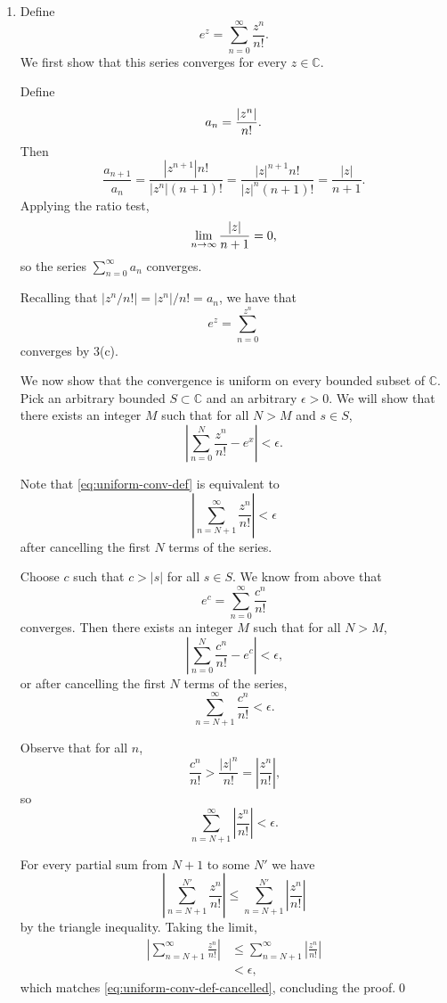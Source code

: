 \documentclass[oneside]{article}
\newcommand\abs[1]{\left|#1\right|}
\newcommand\bbC{\mathbb{C}}
\begin{document}
  \begin{enumerate}[label=\textbf{(\alph*)}]
    \item Define \[
      e^z = \sum_{n=0}^\infty \frac{z^n}{n!}\text{.}
    \]
    We first show that this series converges for every $z \in \bbC$.

    Define \[
      a_n = \frac{\abs{z^n}}{n!} \text.
    \] Then\[
      \frac{a_{n+1}}{a_n}
      = \frac{\abs{z^{n+1}}n!}{\abs{z^n}(n+1)!}
      = \frac{\abs{z}^{n+1}n!}{\abs{z}^n(n+1)!}
      = \frac{\abs{z}}{n+1} \text{.}
    \] Applying the ratio test,\[
      \lim_{n\to\infty} \frac{\abs{z}}{n+1} = 0\text,
    \] so the series $\sum_{n=0}^\infty a_n$ converges.

    Recalling that $\abs{z^n / n!} = \abs{z^n}/n! = a_n$, we have that \[
      e^z = \sum_{n=0}^{z^n}
    \] converges by 3(c).

    We now show that the convergence is uniform on every bounded subset of
    $\bbC$. Pick an arbitrary bounded $S \subset \bbC$ and an arbitrary
    $\epsilon > 0$. We will show that there exists an integer $M$ such that
    for all $N > M$ and $s \in S$, \begin{equation} \label{eq:uniform-conv-def}
      \abs{\sum_{n=0}^N\frac{z^n}{n!} - e^x} < \epsilon \text{.}
    \end{equation}

    Note that \eqref{eq:uniform-conv-def} is equivalent to \begin{equation}
      \label{eq:uniform-conv-def-cancelled}
      \abs{\sum_{n=N+1}^\infty\frac{z^n}{n!}} < \epsilon
    \end{equation} after cancelling the first $N$ terms of the series.

    Choose $c$ such that $c > \abs{s}$ for all $s \in S$. We know from above
    that \[
      e^c = \sum_{n=0}^\infty \frac{c^n}{n!}
    \] converges. Then there exists an integer $M$ such that for all $N > M$,\[
      \abs{\sum_{n=0}^N \frac{c^n}{n!} - e^c} < \epsilon \text{,}
    \] or after cancelling the first $N$ terms of the series,\[
      \sum_{n=N+1}^\infty \frac{c^n}{n!} < \epsilon \text{.}
    \]

    Observe that for all $n$, \[
      \frac{c^n}{n!} > \frac{\abs{z}^n}{n!} = \abs{\frac{z^n}{n!}}\text{,}
    \] so \[
      \sum_{n=N+1}^\infty \abs{\frac{z^n}{n!}} < \epsilon \text{.}
    \]

    For every partial sum from $N+1$ to some $N'$ we have\[
      \abs{\sum_{n=N+1}^{N'} \frac{z^n}{n!}}
      \leq \sum_{n=N+1}^{N'} \abs{\frac{z^n}{n!}}
    \] by the triangle inequality. Taking the limit, \begin{align*}
      \abs{\sum_{n=N+1}^\infty \frac{z^n}{n!}}
      &\leq \sum_{n=N+1}^\infty \abs{\frac{z^n}{n!}} \\
      &< \epsilon\text{,}
    \end{align*} which matches \eqref{eq:uniform-conv-def-cancelled}, concluding
    the proof.\qed
  \end{enumerate}
\end{document}
